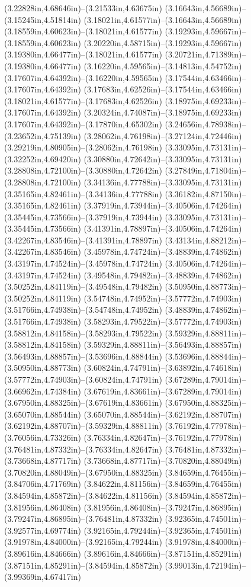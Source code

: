 (3.22828in,4.68646in)--(3.21533in,4.63675in) (3.16643in,4.56689in)--(3.15245in,4.51814in) (3.18021in,4.61577in)--(3.16643in,4.56689in) (3.18559in,4.60623in)--(3.18021in,4.61577in) (3.19293in,4.59667in)--(3.18559in,4.60623in) (3.20220in,4.58715in)--(3.19293in,4.59667in) (3.19380in,4.66477in)--(3.18021in,4.61577in) (3.20721in,4.71389in)--(3.19380in,4.66477in) (3.16220in,4.59565in)--(3.14813in,4.54752in) (3.17607in,4.64392in)--(3.16220in,4.59565in) (3.17544in,4.63466in)--(3.17607in,4.64392in) (3.17683in,4.62526in)--(3.17544in,4.63466in) (3.18021in,4.61577in)--(3.17683in,4.62526in) (3.18975in,4.69233in)--(3.17607in,4.64392in) (3.20324in,4.74087in)--(3.18975in,4.69233in) (3.17607in,4.64392in)--(3.17870in,4.65302in) (3.24656in,4.78938in)--(3.23652in,4.75139in) (3.28062in,4.76198in)--(3.27124in,4.72446in) (3.29219in,4.80905in)--(3.28062in,4.76198in) (3.33095in,4.73131in)--(3.32252in,4.69420in) (3.30880in,4.72642in)--(3.33095in,4.73131in) (3.28808in,4.72100in)--(3.30880in,4.72642in) (3.27849in,4.71804in)--(3.28808in,4.72100in) (3.34136in,4.77788in)--(3.33095in,4.73131in) (3.35165in,4.82461in)--(3.34136in,4.77788in) (3.36182in,4.87150in)--(3.35165in,4.82461in) (3.37919in,4.73944in)--(3.40506in,4.74264in) (3.35445in,4.73566in)--(3.37919in,4.73944in) (3.33095in,4.73131in)--(3.35445in,4.73566in) (3.41391in,4.78897in)--(3.40506in,4.74264in) (3.42267in,4.83546in)--(3.41391in,4.78897in) (3.43134in,4.88212in)--(3.42267in,4.83546in) (3.45978in,4.74724in)--(3.48839in,4.74862in) (3.43197in,4.74524in)--(3.45978in,4.74724in) (3.40506in,4.74264in)--(3.43197in,4.74524in) (3.49548in,4.79482in)--(3.48839in,4.74862in) (3.50252in,4.84119in)--(3.49548in,4.79482in) (3.50950in,4.88773in)--(3.50252in,4.84119in) (3.54748in,4.74952in)--(3.57772in,4.74903in) (3.51766in,4.74938in)--(3.54748in,4.74952in) (3.48839in,4.74862in)--(3.51766in,4.74938in) (3.58293in,4.79522in)--(3.57772in,4.74903in) (3.58812in,4.84158in)--(3.58293in,4.79522in) (3.59329in,4.88811in)--(3.58812in,4.84158in) (3.59329in,4.88811in)--(3.56493in,4.88857in) (3.56493in,4.88857in)--(3.53696in,4.88844in) (3.53696in,4.88844in)--(3.50950in,4.88773in) (3.60824in,4.74791in)--(3.63892in,4.74618in) (3.57772in,4.74903in)--(3.60824in,4.74791in) (3.67289in,4.79014in)--(3.66962in,4.74384in) (3.67619in,4.83661in)--(3.67289in,4.79014in) (3.67950in,4.88325in)--(3.67619in,4.83661in) (3.67950in,4.88325in)--(3.65070in,4.88544in) (3.65070in,4.88544in)--(3.62192in,4.88707in) (3.62192in,4.88707in)--(3.59329in,4.88811in) (3.76192in,4.77978in)--(3.76056in,4.73326in) (3.76334in,4.82647in)--(3.76192in,4.77978in) (3.76481in,4.87332in)--(3.76334in,4.82647in) (3.76481in,4.87332in)--(3.73668in,4.87717in) (3.73668in,4.87717in)--(3.70820in,4.88049in) (3.70820in,4.88049in)--(3.67950in,4.88325in) (3.84659in,4.76455in)--(3.84706in,4.71769in) (3.84622in,4.81156in)--(3.84659in,4.76455in) (3.84594in,4.85872in)--(3.84622in,4.81156in) (3.84594in,4.85872in)--(3.81956in,4.86408in) (3.81956in,4.86408in)--(3.79247in,4.86895in) (3.79247in,4.86895in)--(3.76481in,4.87332in) (3.92365in,4.74501in)--(3.92577in,4.69774in) (3.92165in,4.79244in)--(3.92365in,4.74501in) (3.91978in,4.84000in)--(3.92165in,4.79244in) (3.91978in,4.84000in)--(3.89616in,4.84666in) (3.89616in,4.84666in)--(3.87151in,4.85291in) (3.87151in,4.85291in)--(3.84594in,4.85872in) (3.99013in,4.72194in)--(3.99369in,4.67417in) 